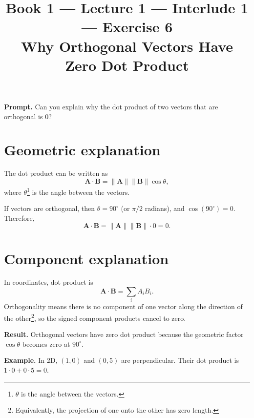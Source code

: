 \documentclass[11pt]{article}
\title{\textbf{Book 1 --- Lecture 1 --- Interlude 1 --- Exercise 6}\\[2mm]
\large Why Orthogonal Vectors Have Zero Dot Product}
\author{}
\date{}
\newcommand{\promptbox}[1]{%
  \begingroup\setlength{\fboxsep}{10pt}\noindent
  \colorbox{blue!8}{\parbox{\dimexpr\linewidth-2\fboxsep\relax}{\textbf{Prompt. }#1}}
  \endgroup
}
\newcommand{\resultbox}[1]{%
  \begingroup\setlength{\fboxsep}{10pt}\noindent
  \colorbox{purple!8}{\parbox{\dimexpr\linewidth-2\fboxsep\relax}{\textbf{Result. }#1}}
  \endgroup
}
\newcommand{\examplebox}[1]{%
  \begingroup\setlength{\fboxsep}{10pt}\noindent
  \colorbox{green!8}{\parbox{\dimexpr\linewidth-2\fboxsep\relax}{\textbf{Example. }#1}}
  \endgroup
}
\begin{document}
\maketitle

\promptbox{Can you explain why the dot product of two vectors that are
orthogonal is \(0\)?}

\section*{Geometric explanation}
The dot product can be written as
\[
\mathbf{A}\cdot\mathbf{B} = \lVert\mathbf{A}\rVert\lVert\mathbf{B}\rVert\cos\theta,
\]
where \(\theta\)\footnote{\(\theta\) is the angle between the vectors.} is the
angle between the vectors.

If vectors are orthogonal, then \(\theta=90^\circ\) (or \(\pi/2\) radians), and
\(\cos(90^\circ)=0\). Therefore,
\[
\mathbf{A}\cdot\mathbf{B}
= \lVert\mathbf{A}\rVert\lVert\mathbf{B}\rVert\cdot 0
= 0.
\]

\section*{Component explanation}
In coordinates, dot product is
\[
\mathbf{A}\cdot\mathbf{B}=\sum_i A_i B_i.
\]
Orthogonality means there is no component of one vector along the direction of
the other\footnote{Equivalently, the projection of one onto the other has zero
length.}, so the signed component products cancel to zero.

\resultbox{Orthogonal vectors have zero dot product because the geometric factor
\(\cos\theta\) becomes zero at \(90^\circ\).}

\examplebox{In 2D, \((1,0)\) and \((0,5)\) are perpendicular. Their dot product
is \(1\cdot0+0\cdot5=0\).}
\end{document}
